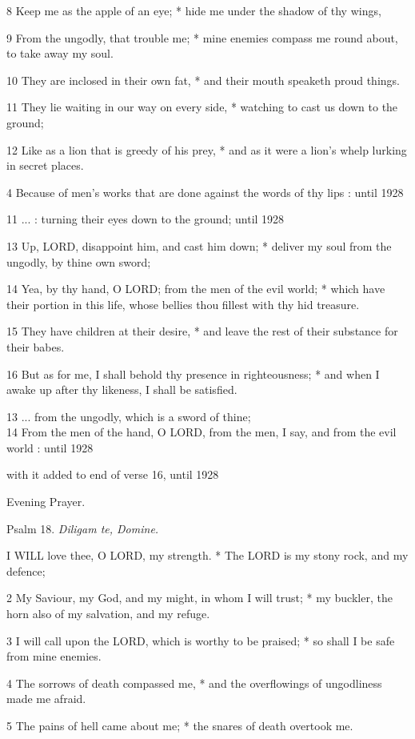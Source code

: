 8 Keep me as the apple of an eye; * hide me under the
shadow of thy wings,

9 From the ungodly, that trouble me; * mine enemies compass
me round about, to take away my soul.

10 They are inclosed in their own fat, * and their mouth
speaketh proud things.

11 They lie waiting in our way on every side, * watching
to cast us down to the ground;

12 Like as a lion that is greedy of his prey, * and as
it were a lion’s whelp lurking in secret places.

4 Because of men's works that
are done against the words of thy lips : until
1928

11 ... : turning their eyes down
to the ground;
until 1928

13 Up, LORD, disappoint him, and cast him down; *
deliver my soul from the ungodly, by thine own sword; 

14 Yea, by thy hand, O LORD; from
the men of the evil world; * which have their portion in this life, whose
bellies thou fillest with thy hid treasure.

15 They have children at their desire, * and leave the
rest of their substance for their babes.

16 But as for me, I shall behold thy presence in righteousness;
* and when I awake up after thy likeness, I shall be satisfied. 

13 ... from the ungodly, which
is a sword of thine;\\
14 From the men of the hand, O LORD,
from the men, I say, and from the evil world : until
1928

with it added
to end of verse 16, until 1928

Evening Prayer.

Psalm 18. \emph{Diligam
te, Domine.}

I
WILL love thee, O LORD, my strength. * The LORD
is my stony rock, and my defence;

2 My Saviour, my God, and my might, in whom I will
trust; * my buckler, the horn also of my salvation, and my refuge.

3 I will call upon the LORD,
which is worthy to be praised; * so shall I be safe from mine enemies.

4 The sorrows of death compassed me, * and the overflowings
of ungodliness made me afraid.

5 The pains of hell came about me; * the snares of
death overtook me.

